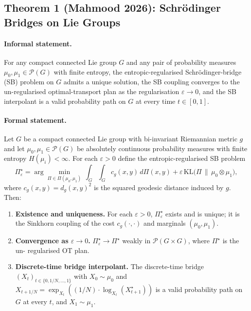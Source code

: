 \subsection{Theorem 1 (Mahmood 2026): Schrödinger Bridges on Lie Groups}
\label{sec:math:T1}

\paragraph{Informal statement.}
For any compact connected Lie group $G$ and any pair of probability
measures $\mu_0, \mu_1 \in \mathcal{P}(G)$ with finite entropy, the
entropic-regularised Schrödinger-bridge (SB) problem on $G$ admits a
unique solution, the SB coupling converges to the un-regularised
optimal-transport plan as the regularisation $\varepsilon \to 0$, and
the SB interpolant is a valid probability path on $G$ at every time
$t \in [0, 1]$.

\paragraph{Formal statement.}
\begin{theorem}
\label{thm:T1-sb-lie}
Let $G$ be a compact connected Lie group with bi-invariant
Riemannian metric $g$ and let $\mu_0, \mu_1 \in \mathcal{P}(G)$ be
absolutely continuous probability measures with finite entropy
$H(\mu_i) < \infty$.  For each $\varepsilon > 0$ define the
entropic-regularised SB problem
\[
  \Pi_{\varepsilon}^{\star}
  = \arg\min_{\Pi \in \Pi(\mu_0,\mu_1)} \,
     \int_G \int_G c_g(x, y) \, d\Pi(x, y)
     + \varepsilon \, \mathrm{KL}\!\bigl(\Pi \,\|\, \mu_0 \otimes \mu_1\bigr),
\]
where $c_g(x, y) = d_g(x, y)^2$ is the squared geodesic distance
induced by $g$.  Then:
\begin{enumerate}
  \item[(i)] \textbf{Existence and uniqueness.}  For each
    $\varepsilon > 0$, $\Pi_{\varepsilon}^{\star}$ exists and is
    unique; it is the Sinkhorn coupling of the cost
    $c_g(\cdot, \cdot)$ and marginals $(\mu_0, \mu_1)$.
  \item[(ii)] \textbf{Convergence as $\varepsilon \to 0$.}
    $\Pi_{\varepsilon}^{\star} \to \Pi^{\star}$ weakly in
    $\mathcal{P}(G \times G)$, where $\Pi^{\star}$ is the un-
    regularised OT plan.
  \item[(iii)] \textbf{Discrete-time bridge interpolant.}  The
    discrete-time bridge $(X_t)_{t \in \{0, 1/N, \ldots, 1\}}$ with
    $X_0 \sim \mu_0$ and $X_{t + 1/N} = \exp_{X_t}((1/N) \cdot
    \log_{X_t}(X_{t+1}^{\star}))$ is a valid probability path on
    $G$ at every $t$, and $X_1 \sim \mu_1$.
\end{enumerate}
\end{theorem}

